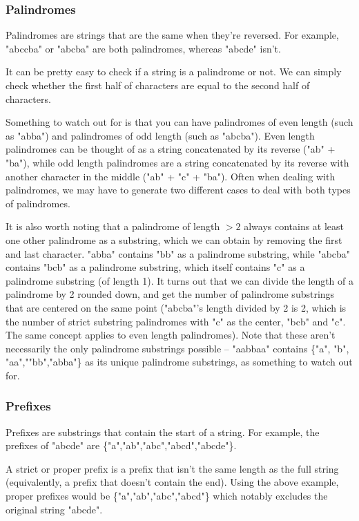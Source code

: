 \subsubsection{Palindromes}

Palindromes are strings that are the same when they're reversed. For example, "abccba" or "abcba" are both palindromes, whereas "abcde" isn't.

It can be pretty easy to check if a string is a palindrome or not. We can simply check whether the first half of characters are equal to the second half of characters.


Something to watch out for is that you can have palindromes of even length (such as "abba") and palindromes of odd length (such as "abcba"). Even length palindromes can be thought of as a string concatenated by its reverse ("ab" + "ba"), while odd length palindromes are a string concatenated by its reverse with another character in the middle ("ab" + "c" + "ba"). Often when dealing with palindromes, we may have to generate two different cases to deal with both types of palindromes.

It is also worth noting that a palindrome of length $> 2$ always contains at least one other palindrome as a substring, which we can obtain by removing the first and last character. "abba" contains "bb" as a palindrome substring, while "abcba" contains "bcb" as a palindrome substring, which itself contains "c" as a palindrome substring (of length 1). It turns out that we can divide the length of a palindrome by 2 rounded down, and get the number of palindrome substrings that are centered on the same point ("abcba"'s length divided by 2 is 2, which is the number of strict substring palindromes with "c" as the center, "bcb" and "c". The same concept applies to even length palindromes). Note that these aren't necessarily the only palindrome substrings possible -- "aabbaa" contains \{"a", "b", "aa",""bb","abba"\} as its unique palindrome substrings, as something to watch out for.

\subsubsection{Prefixes}

Prefixes are substrings that contain the start of a string. For example, the prefixes of "abcde" are \{"a","ab","abc","abcd","abcde"\}.

A strict or proper prefix is a prefix that isn't the same length as the full string (equivalently, a prefix that doesn't contain the end). Using the above example, proper prefixes would be \{"a","ab","abc","abcd"\} which notably excludes the original string "abcde".

